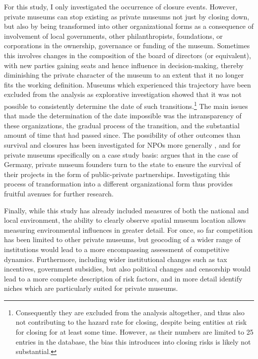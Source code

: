 \documentclass[12pt]{article}
\begin{document}
For this study, I only investigated the occurrence of closure events.
However, private museums can stop existing as private museums not just by closing down, but also by being transformed into other organizational forms as a consequence of involvement of local governments, other philanthropists, foundations, or corporations in the ownership, governance or funding of the museum.
Sometimes this involves changes in the composition of the board of directors (or equivalent), with new parties gaining seats and hence influence in decision-making, thereby diminishing the private character of the museum to an extent that it no longer fits the working definition.
Museums which experienced this trajectory have been excluded from the analysis as explorative investigation showed that it was not possible to consistently determine the date of such transitions.\footnote{Consequently they are excluded from the analysis altogether, and thus also not contributing to the hazard rate for closing, despite being entities at risk for closing for at least some time. However, as their numbers are limited to 25 entries in the database, the bias this introduces into closing risks is likely not substantial.}
The main issues that made the determination of the date impossible was the intransparency of these organizations, the gradual process of the transition, and the substantial amount of time that had passed since.
The possibility of other outcomes than survival and closures has been investigated for NPOs more generally
\parencite{Searing_2020_zombies,HernandezOrtiz_2022_discontinuity,Helmig_Ingerfurth_Pinz_2013_nonprofit}, and for private museums specifically on a case study basis: 
\textcite{Walker_2019_collector} argues that in the case of Germany, private museum founders turn to the state to ensure the survival of their projects in the form of public-private partnerships.
Investigating this process of transformation into a different organizational form thus provides fruitful avenues for further research. 


Finally, while this study has already included measures of both the national and local environment, the ability to clearly observe spatial museum location allows measuring environmental influences in greater detail.
For once, so far competition has been limited to other private museums, but geocoding of a wider range of institutions would lead to a more encompassing assessment of competitive dynamics.
Furthermore, including wider institutional changes such as tax incentives, government subsidies, but also political changes and censorship would lead to a more complete description of risk factors, and in more detail identify niches which are particularly suited for private museums.


\begin{sloppypar}
\printbibliography
\end{sloppypar}
\end{document}
